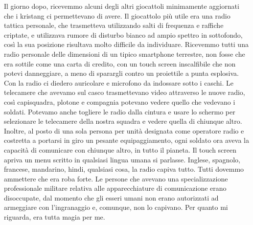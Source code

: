 \hfill\break

Il giorno dopo, ricevemmo alcuni degli altri giocattoli minimamente
aggiornati che i kristang ci permettevano di avere. Il giocattolo più
utile era una radio tattica personale, che trasmetteva utilizzando salti
di frequenza e raffiche criptate, e utilizzava rumore di disturbo bianco
ad ampio spettro in sottofondo, così la sua posizione risultava molto
difficile da individuare. Ricevemmo tutti una radio personale delle
dimensioni di un tipico smartphone terrestre, non fosse che era sottile
come una carta di credito, con un touch screen inscalfibile che non
potevi danneggiare, a meno di sparargli contro un proiettile a punta
esplosiva. Con la radio ci diedero auricolare e microfono da indossare
sotto i caschi. Le telecamere che avevamo sul casco trasmettevano video
attraverso le nuove radio, così capisquadra, plotone e compagnia
potevano vedere quello che vedevano i soldati. Potevamo anche togliere
le radio dalla cintura e usare lo schermo per selezionare le telecamere
della nostra squadra e vedere quella di chiunque altro. Inoltre, al
posto di una sola persona per unità designata come operatore radio e
costretta a portarsi in giro un pesante equipaggiamento, ogni soldato
ora aveva la capacità di comunicare con chiunque altro, in tutto il
pianeta. Il touch screen apriva un menu scritto in qualsiasi lingua
umana si parlasse. Inglese, spagnolo, francese, mandarino, hindi,
qualsiasi cosa, la radio capiva tutto. Tutti dovemmo ammettere che era
roba forte. Le persone che avevano una specializzazione professionale
militare relativa alle apparecchiature di comunicazione erano
disoccupate, dal momento che gli esseri umani non erano autorizzati ad
armeggiare con l'ingranaggio e, comunque, non lo capivano. Per quanto mi
riguarda, era tutta magia per me.

